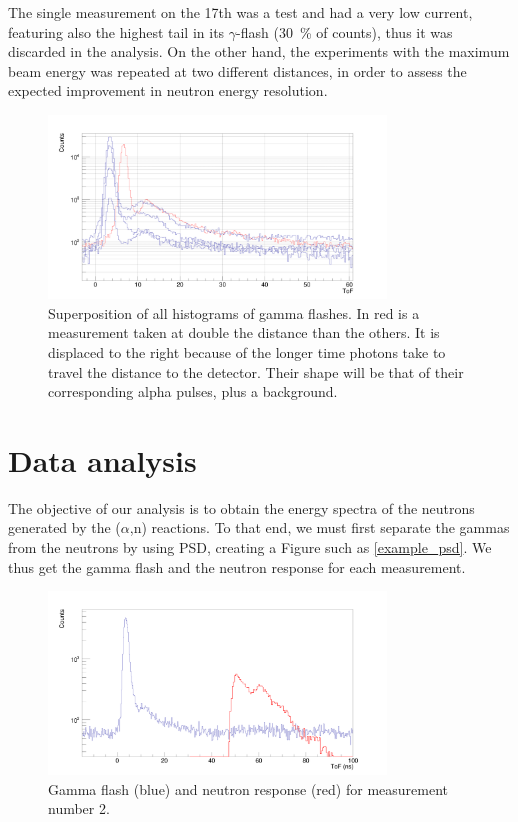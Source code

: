 \documentclass[a4paper,12pt]{report}
\newcommand{\an}{($\alpha$,n) }
\begin{document}
The single measurement on the 17th was a test and had a very low current, featuring also the highest tail in its $\gamma$-flash (\qty{30}{\percent} of counts), thus it was discarded in the analysis.
On the other hand, the experiments with the maximum beam energy was repeated at two different distances, in order to assess the expected improvement in neutron energy resolution.

\begin{figure}[H]
	\centering
	\includegraphics[width=0.80\textwidth]{uneven_gflash.png}
	\caption{Superposition of all histograms of gamma flashes.
	In red is a measurement taken at double the distance than the others.
	It is displaced to the right because of the longer time photons take to travel the distance to the detector.
	Their shape will be that of their corresponding alpha pulses, plus a background.}
	\label{uneven_gflash}
\end{figure}

\section{Data analysis}
The objective of our analysis is to obtain the energy spectra of the neutrons generated by the \an reactions.
To that end, we must first separate the gammas from the neutrons by using PSD, creating a Figure such as \ref{example_psd}.
We thus get the gamma flash and the neutron response for each measurement.

\begin{figure}[H]
	\centering
	\includegraphics[width=0.80\textwidth]{separated_tof.png}
	\caption{Gamma flash (blue) and neutron response (red) for measurement number 2.}
	\label{separated_tof}
\end{figure}
\end{document}
